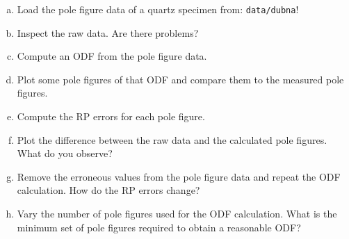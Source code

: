 \begin{frame}

  \begin{Exercise}
    \begin{enumerate}[a)]
    \item Load the pole figure data of a quartz specimen from:
      \texttt{data/dubna}!
    \item Inspect the raw data. Are there problems?
    \item Compute an ODF from the pole figure data.
    \item Plot some pole figures of that ODF and compare them to the measured
      pole figures.
    \item Compute the RP errors for each pole figure.
    \item Plot the difference between the raw data and the calculated pole
      figures. What do you observe?
    \item Remove the erroneous values from the pole figure data and repeat the
      ODF calculation. How do the RP errors change?
    \item Vary the number of pole figures used for the ODF calculation. What
      is the minimum set of pole figures required to obtain a reasonable ODF?
    \end{enumerate}
  \end{Exercise}

\end{frame}


